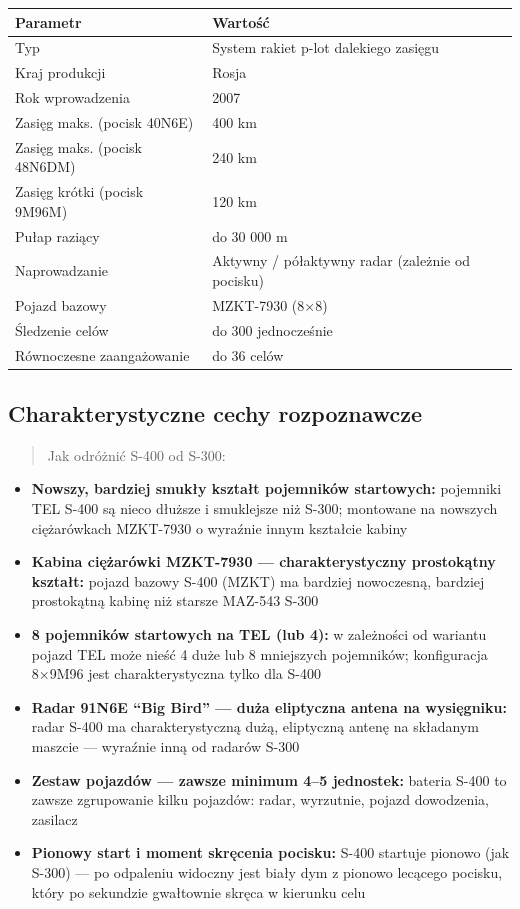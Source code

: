 \documentclass[12pt,oneside]{book}
\providecommand{\tightlist}{%
  \setlength{\itemsep}{0pt}\setlength{\parskip}{0pt}}
\begin{document}
\begin{longtable}[]{@{}ll@{}}
\toprule\noalign{}
Parametr & Wartość \\
\midrule\noalign{}
\endhead
\bottomrule\noalign{}
\endlastfoot
Typ & System rakiet p-lot dalekiego zasięgu \\
Kraj produkcji & Rosja \\
Rok wprowadzenia & 2007 \\
Zasięg maks. (pocisk 40N6E) & 400 km \\
Zasięg maks. (pocisk 48N6DM) & 240 km \\
Zasięg krótki (pocisk 9M96M) & 120 km \\
Pułap raziący & do 30 000 m \\
Naprowadzanie & Aktywny / półaktywny radar (zależnie od pocisku) \\
Pojazd bazowy & MZKT-7930 (8×8) \\
Śledzenie celów & do 300 jednocześnie \\
Równoczesne zaangażowanie & do 36 celów \\
\end{longtable}

\subsection{Charakterystyczne cechy
rozpoznawcze}\label{charakterystyczne-cechy-rozpoznawcze-43}

\begin{quote}
Jak odróżnić S-400 od S-300:
\end{quote}

\begin{itemize}
\tightlist
\item
  \textbf{Nowszy, bardziej smukły kształt pojemników startowych:}
  pojemniki TEL S-400 są nieco dłuższe i smuklejsze niż S-300; montowane
  na nowszych ciężarówkach MZKT-7930 o wyraźnie innym kształcie kabiny
\item
  \textbf{Kabina ciężarówki MZKT-7930 --- charakterystyczny prostokątny
  kształt:} pojazd bazowy S-400 (MZKT) ma bardziej nowoczesną, bardziej
  prostokątną kabinę niż starsze MAZ-543 S-300
\item
  \textbf{8 pojemników startowych na TEL (lub 4):} w zależności od
  wariantu pojazd TEL może nieść 4 duże lub 8 mniejszych pojemników;
  konfiguracja 8×9M96 jest charakterystyczna tylko dla S-400
\item
  \textbf{Radar 91N6E ``Big Bird'' --- duża eliptyczna antena na
  wysięgniku:} radar S-400 ma charakterystyczną dużą, eliptyczną antenę
  na składanym maszcie --- wyraźnie inną od radarów S-300
\item
  \textbf{Zestaw pojazdów --- zawsze minimum 4--5 jednostek:} bateria
  S-400 to zawsze zgrupowanie kilku pojazdów: radar, wyrzutnie, pojazd
  dowodzenia, zasilacz
\item
  \textbf{Pionowy start i moment skręcenia pocisku:} S-400 startuje
  pionowo (jak S-300) --- po odpaleniu widoczny jest biały dym z pionowo
  lecącego pocisku, który po sekundzie gwałtownie skręca w kierunku celu
\end{itemize}
\end{document}
